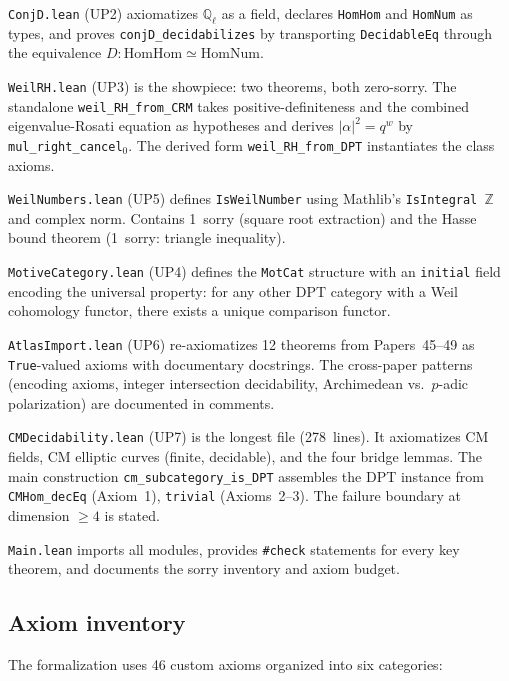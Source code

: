 \documentclass[11pt]{article}
\theoremstyle{definition}
\theoremstyle{remark}
\newcommand{\Z}{\mathbb{Z}}
\newcommand{\Q}{\mathbb{Q}}
\newcommand{\Qell}{\Q_\ell}
\begin{document}
\texttt{ConjD.lean} (UP2) axiomatizes $\Qell$ as a field, declares \texttt{HomHom} and \texttt{HomNum} as types, and proves \texttt{conjD\_decidabilizes} by transporting \texttt{DecidableEq} through the equivalence $D : \mathrm{HomHom} \simeq \mathrm{HomNum}$.

\texttt{WeilRH.lean} (UP3) is the showpiece: two theorems, both zero-sorry. The standalone \texttt{weil\_RH\_from\_CRM} takes positive-definiteness and the combined eigenvalue-Rosati equation as hypotheses and derives $|\alpha|^2 = q^w$ by \texttt{mul\_right\_cancel$_0$}. The derived form \texttt{weil\_RH\_from\_DPT} instantiates the class axioms.

\texttt{WeilNumbers.lean} (UP5) defines \texttt{IsWeilNumber} using Mathlib's \texttt{IsIntegral~$\Z$} and complex norm. Contains 1~sorry (square root extraction) and the Hasse bound theorem (1~sorry: triangle inequality).

\texttt{MotiveCategory.lean} (UP4) defines the \texttt{MotCat} structure with an \texttt{initial} field encoding the universal property: for any other DPT category with a Weil cohomology functor, there exists a unique comparison functor.

\texttt{AtlasImport.lean} (UP6) re-axiomatizes 12 theorems from Papers~45--49 as \texttt{True}-valued axioms with documentary docstrings. The cross-paper patterns (encoding axioms, integer intersection decidability, Archimedean vs.\ $p$-adic polarization) are documented in comments.

\texttt{CMDecidability.lean} (UP7) is the longest file (278~lines). It axiomatizes CM fields, CM elliptic curves (finite, decidable), and the four bridge lemmas. The main construction \texttt{cm\_subcategory\_is\_DPT} assembles the DPT instance from \texttt{CMHom\_decEq} (Axiom~1), \texttt{trivial} (Axioms~2--3). The failure boundary at dimension $\geq 4$ is stated.

\texttt{Main.lean} imports all modules, provides \texttt{\#check} statements for every key theorem, and documents the sorry inventory and axiom budget.

\subsection{Axiom inventory}

The formalization uses 46 custom axioms organized into six categories:
\end{document}
